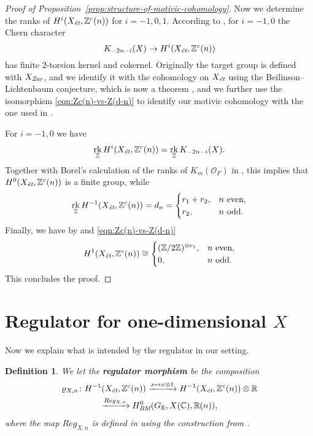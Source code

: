 \documentclass[draft]{article}
\DeclareMathOperator{\rk}{rk}
\newcommand{\CC}{\mathbb{C}}
\newcommand{\RR}{\mathbb{R}}
\newcommand{\ZZ}{\mathbb{Z}}
\newcommand{\BM}{\text{\it BM}}
\newcommand{\et}{\text{\it \'{e}t}}
\newcommand{\Zar}{\text{\it Zar}}
\theoremstyle{myplain}
\theoremstyle{mydefinition}
\newtheorem{definition}[theorem]{Definition}
\numberwithin{equation}{section}
\begin{document}
\begin{proof}[Proof of Proposition~\ref{prop:structure-of-motivic-cohomology}]
  Now we determine the ranks of $H^i (X_\et, \ZZ^c (n))$ for $i = -1,0,1$. According to \cite[Proposition~2.1]{Kolster-Sands-2008}, for
  $i = -1,0$ the Chern character
  $$K_{-2n - i} (X) \to H^i (X_\et, \ZZ^c(n))$$
  has finite $2$-torsion kernel and cokernel. Originally the target group is
  defined with $X_\Zar$, and we identify it with the cohomology on $X_\et$ using
  the Beilinson--Lichtenbaum conjecture, which is now a theorem
  \cite[Theorem~1.2]{Geisser-2004-Dedekind}, and we further use the isomorphism
  \eqref{eqn:Zc(n)-vs-Z(d-n)} to identify our motivic cohomology with the one
  used in \cite{Kolster-Sands-2008}.

  For $i = -1,0$ we have
  $$\rk_\ZZ H^i (X_\et, \ZZ^c(n)) = \rk_\ZZ K_{-2n - i} (X).$$
  Together with Borel's calculation of the ranks of $K_m (\mathcal{O}_F)$ in \cite{Borel-1974}, this implies that
  $H^0 (X_\et, \ZZ^c (n))$ is a finite group, while
  \[ \rk_\ZZ H^{-1} (X_\et, \ZZ^c(n)) = d_n =
    \begin{cases}
      r_1 + r_2, & n \text{ even}, \\
      r_2, & n \text{ odd}.
    \end{cases} \]
  Finally, we have by \cite[p.\,179]{Kolster-Sands-2008} and
  \eqref{eqn:Zc(n)-vs-Z(d-n)}
  \[ H^1 (X_\et, \ZZ^c(n)) \cong
    \begin{cases}
      (\ZZ/2\ZZ)^{\oplus r_1}, & n\text{ even}, \\
      0, & n\text{ odd}.
    \end{cases} \]
  This concludes the proof.
\end{proof}


\section{Regulator for one-dimensional $X$}
\label{sec:regulators}

Now we explain what is intended by the regulator in our setting.

\begin{definition}
  We let the \textbf{regulator morphism} be the composition
  \begin{multline*}
    \varrho_{X,n}\colon
    H^{-1} (X_\et, \ZZ^c (n)) \xrightarrow{x \mapsto x\otimes 1}
    H^{-1} (X_\et, \ZZ^c (n)) \otimes \RR \\
    \xrightarrow{Reg_{X,n}} H^0_\BM (G_\RR, X(\CC), \RR(n)),
  \end{multline*}
  where the map $Reg_{X,n}$ is defined in \cite[\S 2]{Beshenov-Weil-etale-2}
  using the construction from \cite{Kerr-Lewis-Muller-Stach-2006}.
\end{definition}
\end{document}
